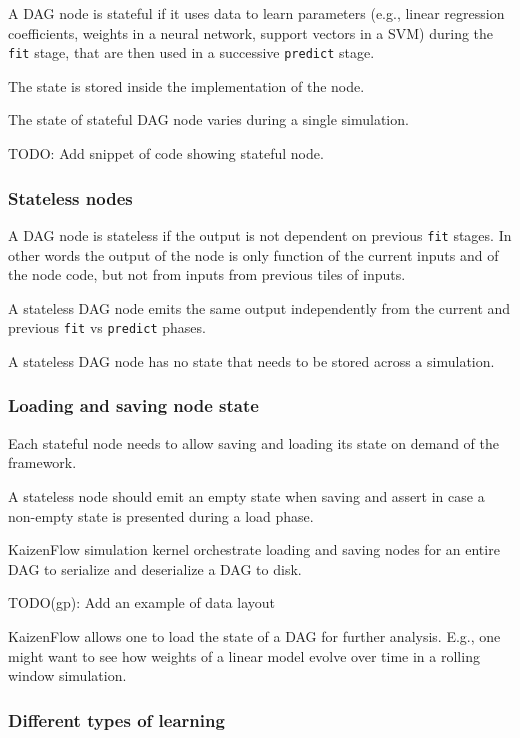 \documentclass[11pt, reqno]{amsart}
\theoremstyle{definition}
\theoremstyle{remark}
\begin{document}
A DAG node is stateful if it uses data to learn parameters (e.g., linear
regression coefficients, weights in a neural network, support vectors in a SVM)
during the \verb|fit| stage, that are then used in a successive
\verb|predict| stage.

The state is stored inside the implementation of the node.

The state of stateful DAG node varies during a single simulation.

TODO: Add snippet of code showing stateful node.

\subsubsection{Stateless nodes}
A DAG node is stateless if the output is not dependent on previous \verb|fit|
stages. In other words the output of the node is only function of the current
inputs and of the node code, but not from inputs from previous tiles of inputs.

A stateless DAG node emits the same output independently from the current and
previous \verb|fit| vs \verb|predict| phases.

A stateless DAG node has no state that needs to be stored across a simulation.

\subsubsection{Loading and saving node state}

Each stateful node needs to allow saving and loading its state on demand of the
framework.

A stateless node should emit an empty state when saving and assert in case a
non-empty state is presented during a load phase.

KaizenFlow simulation kernel orchestrate loading and saving nodes for an entire
DAG to serialize and deserialize a DAG to disk.

TODO(gp): Add an example of data layout

KaizenFlow allows one to load the state of a DAG for further analysis. E.g., one
might want to see how weights of a linear model evolve over time in a rolling
window simulation.

\subsubsection{Different types of learning}
\end{document}
